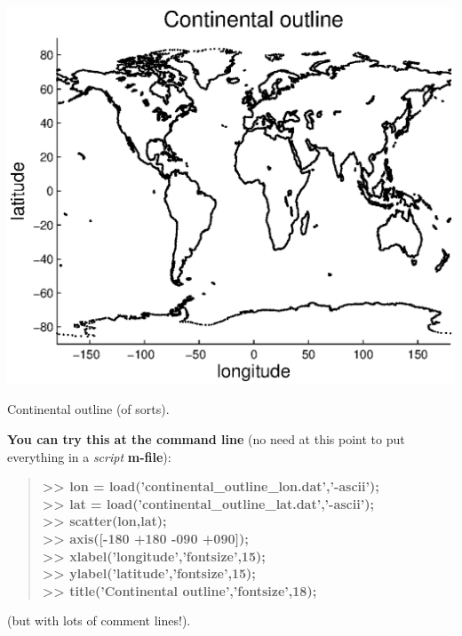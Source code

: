 \documentclass{tufte-book} %
\newenvironment{docspecbold}{\begin{quotation}\ttfamily\bfseries\parskip0pt\parindent0pt\ignorespaces}{\end{quotation}}
\begin{document}
\begin{marginfigure}[0.0in]
\includegraphics[width=\linewidth]{ch3-continentaloutline.eps}
\caption{Continental outline (of sorts).}
\label{fig:ch3-continentaloutline}
\end{marginfigure}

\textbf{You can try this at the command line} (no need at this point to put everything in a \textit{script} \textbf{m-file}):

\begin{docspecbold}
>> lon = load('continental\_outline\_lon.dat','-ascii');
\\>> lat = load('continental\_outline\_lat.dat','-ascii');
\\>> scatter(lon,lat);
\\>> axis([-180 +180 -090 +090]);
\\>> xlabel('longitude','fontsize',15);
\\>> ylabel('latitude','fontsize',15);
\\>> title('Continental outline','fontsize',18);
\end{docspecbold}

\noindent (but with lots of comment lines!).
\end{document}
